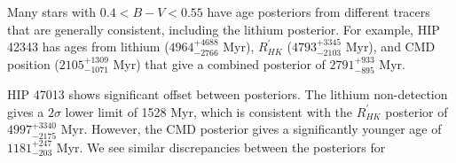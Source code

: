 Many stars with $0.4<B-V<0.55$ have age posteriors from different tracers that are generally consistent, including the lithium posterior. For example, HIP 42343 has ages from lithium ($4964^{+4688}_{-2766}$ Myr), $R^{'}_{HK}$ ($4793^{+3345}_{-2103}$ Myr), and CMD position ($2105^{+1309}_{-1071}$ Myr) that give a combined posterior of $2791^{+933}_{-895}$ Myr. 

HIP 47013 shows significant offset between posteriors. The lithium non-detection gives a $2\sigma$ lower limit of 1528 Myr, which is consistent with the $R^{'}_{HK}$ posterior of $4997^{+3340}_{-2175}$ Myr. However, the CMD posterior gives a significantly younger age of $1181^{+247}_{-203}$ Myr.  We see similar discrepancies between the posteriors for 




